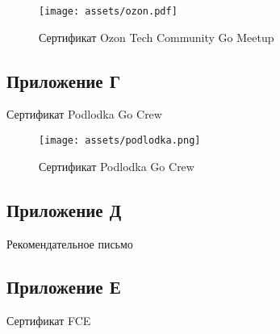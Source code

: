 \documentclass[14pt]{extarticle}
\begin{document}
\begin{figure}[h!]
    \begin{center}
    \texttt{[image: assets/ozon.pdf]}
    \caption{Сертификат Ozon Tech Community Go Meetup}
    \label{fig:ozon}
    \end{center}
\end{figure}

\newpage

\begin{center}

\section*{Приложение Г}

Сертификат Podlodka Go Crew
\end{center}

\begin{figure}[h!]
    \begin{center}
    \texttt{[image: assets/podlodka.png]}
    \caption{Сертификат Podlodka Go Crew}
    \label{fig:podlodka}
    \end{center}
\end{figure}

\newpage

\begin{center}

\section*{Приложение Д}

Рекомендательное письмо
\end{center}



\newpage

\begin{center}
\section*{Приложение Е}

Сертификат FCE
\end{center}


\end{document}
